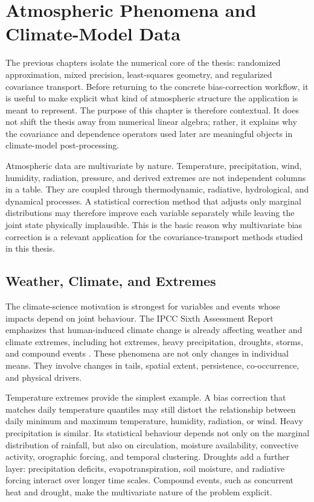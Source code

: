 \chapter{Atmospheric Phenomena and Climate-Model Data}
\label{ch:atmospheric}

The previous chapters isolate the numerical core of the thesis: randomized
approximation, mixed precision, least-squares geometry, and regularized
covariance transport. Before returning to the concrete bias-correction workflow,
it is useful to make explicit what kind of atmospheric structure the application
is meant to represent. The purpose of this chapter is therefore contextual. It
does not shift the thesis away from numerical linear algebra; rather, it explains
why the covariance and dependence operators used later are meaningful objects in
climate-model post-processing.

Atmospheric data are multivariate by nature. Temperature, precipitation, wind,
humidity, radiation, pressure, and derived extremes are not independent columns in
a table. They are coupled through thermodynamic, radiative, hydrological, and
dynamical processes. A statistical correction method that adjusts only marginal
distributions may therefore improve each variable separately while leaving the
joint state physically implausible. This is the basic reason why multivariate
bias correction is a relevant application for the covariance-transport methods
studied in this thesis.

\section{Weather, Climate, and Extremes}

The climate-science motivation is strongest for variables and events whose
impacts depend on joint behaviour. The IPCC Sixth Assessment Report emphasizes
that human-induced climate change is already affecting weather and climate
extremes, including hot extremes, heavy precipitation, droughts, storms, and
compound events \cite{ipcc2021ar6wg1}. These phenomena are not only changes in
individual means. They involve changes in tails, spatial extent, persistence,
co-occurrence, and physical drivers.

Temperature extremes provide the simplest example. A bias correction that
matches daily temperature quantiles may still distort the relationship between
daily minimum and maximum temperature, humidity, radiation, or wind. Heavy
precipitation is similar. Its statistical behaviour depends not only on the
marginal distribution of rainfall, but also on circulation, moisture availability,
convective activity, orographic forcing, and temporal clustering. Droughts add a
further layer: precipitation deficits, evapotranspiration, soil moisture, and
radiative forcing interact over longer time scales. Compound events, such as
concurrent heat and drought, make the multivariate nature of the problem
explicit.

